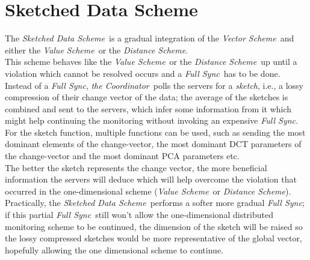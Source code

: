 \documentclass[10pt, conference]{IEEEtran}
\newcommand{\vectorScheme}{\textit{Vector Scheme}}
\newcommand{\valueScheme}{\textit{Value Scheme}}
\newcommand{\distanceScheme}{\textit{Distance Scheme}}
\newcommand{\sketchScheme}{\textit{Sketched Data Scheme}}
\newcommand{\fullSync}{\textit{Full Sync}}
\newcommand{\theCoordinator}{\textit{the Coordinator}}
\begin{document}
\section{Sketched Data Scheme}
The \sketchScheme \ is a gradual integration of the \vectorScheme \ and either the \valueScheme \ or the \distanceScheme . \\
This scheme behaves like the \valueScheme \ or the \distanceScheme \ up until a violation which cannot be resolved occurs and a \fullSync \ has to be done. Instead of a \fullSync , \theCoordinator \ polls the servers for a \textit{sketch}, i.e., a lossy compression of their change vector of the data; the average of the sketches is combined and sent to the servers, which infer some information from it which might help continuing the monitoring without invoking an expensive \fullSync. For the sketch function, multiple functions can be used, such as sending the most dominant elements of the change-vector, the most dominant DCT parameters of the change-vector and the most dominant PCA parameters etc. \\
The better the sketch represents the change vector, the more beneficial information the servers will deduce which will help overcome the violation that occurred in the one-dimensional scheme (\valueScheme \ or \distanceScheme ). \\
Practically, the \sketchScheme \ performs a softer more gradual \fullSync; if this partial \fullSync \ still won't allow the one-dimensional distributed monitoring scheme to be continued, the dimension of the sketch will be raised so the lossy compressed sketches would be more representative of the global vector, hopefully allowing the one dimensional scheme to continue. \\
\end{document}
